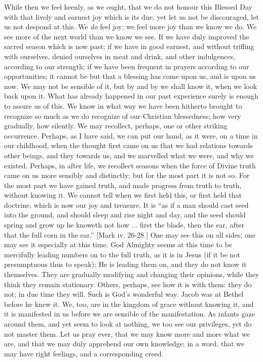 While then we feel keenly, as we ought, that we do not honour this
Blessed Day with that lively and earnest joy which is its due, yet let
us not be discouraged, let us not despond at this. We \emph{do} feel
joy; we feel more joy than we know we do. We see more of the next world
than we know we see. If we have duly improved the sacred season which is
now past; if we have in good earnest, and without trifling with
ourselves, denied ourselves in meat and drink, and other indulgences,
according to our strength; if we have been frequent in prayers according
to our opportunities; it cannot be but that a blessing has come upon us,
and is upon us now. We may not be sensible of it, but by and by we shall
know it, when we look back upon it. What has already happened in our
past experience surely is enough to assure us of this. We know in what
way we have been hitherto brought to recognize so much as we do
recognize of our Christian blessedness; how very gradually, how
silently. We may recollect, perhaps, one or other striking occurrence.
Perhaps, as I have said, we can put our hand, as it were, on a time in
our childhood, when the thought first came on us that we had relations
towards other beings, and they towards us, and we marvelled what we
were, and why we existed. Perhaps, in after life, we recollect seasons
when the force of Divine truth came on us more sensibly and distinctly;
but for the most part it is not so. For the most part we have gained
truth, and made progress from truth to truth, without knowing it. We
cannot tell when we first held this, or first held that doctrine, which
is now our joy and treasure. It is ``as if a man should cast seed
into the ground, and should sleep and rise night and day, and the seed
should spring and grow up he knoweth not how ... first the blade, then
the ear, after that the full corn in the ear.'' [Mark iv. 26-28.]
One may see this on all sides; one may see it especially at this time.
God Almighty seems at this time to be mercifully leading numbers on to
the full truth, as it is in Jesus (if it be not presumptuous thus to
speak); He is leading them on, and they do not know it themselves. They
are gradually modifying and changing their opinions, while they think
they remain stationary. Others, perhaps, see how it is with them: they
do not; in due time they will. Such is God's wonderful way. Jacob was at
Bethel before he knew it. We, too, are in the kingdom of grace without
knowing it, and it is manifested in us before we are sensible of the
manifestation. As infants gaze around them, and yet seem to look at
nothing, we too see our privileges, yet do not master them. Let us pray
ever, that we may know more and more what we are, and that we may duly
apprehend our own knowledge; in a word, that we may have right feelings,
and a corresponding creed.

